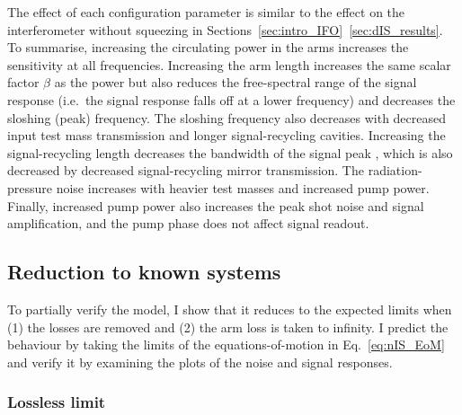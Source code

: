 The effect of each configuration parameter is similar to the effect on the interferometer without squeezing in Sections~\ref{sec:intro_IFO}~\ref{sec:dIS_results}. To summarise, increasing the circulating power in the arms increases the sensitivity at all frequencies. Increasing the arm length increases the same scalar factor $\beta$ as the power but also reduces the free-spectral range of the signal response (i.e.\ the signal response falls off at a lower frequency) and decreases the sloshing (peak) frequency. The sloshing frequency also decreases with decreased input test mass transmission and longer signal-recycling cavities. Increasing the signal-recycling length decreases the bandwidth of the signal peak , which is also decreased by decreased signal-recycling mirror transmission. The radiation-pressure noise increases with heavier test masses and increased pump power. Finally, increased pump power also increases the peak shot noise and signal amplification, and the pump phase does not affect signal readout. 


\subsection{Reduction to known systems}

To partially verify the model, I show that it reduces to the expected limits when (1) the losses are removed and (2) the arm loss is taken to infinity. I predict the behaviour by taking the limits of the equations-of-motion in Eq.~\ref{eq:nIS_EoM} and verify it by examining the plots of the noise and signal responses.

\subsubsection{Lossless limit}
\label{sec:nIS_lossless_limit}

